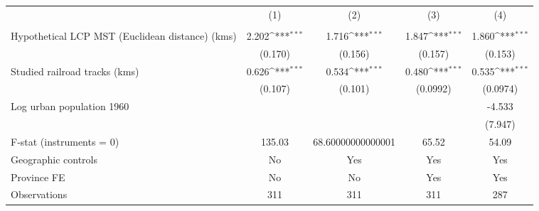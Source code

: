 {
\def\sym#1{\ifmmode^{#1}\else\(^{#1}\)\fi}
\begin{tabular}{l*{4}{c}}
\hline\hline
                &\multicolumn{1}{c}{(1)}&\multicolumn{1}{c}{(2)}&\multicolumn{1}{c}{(3)}&\multicolumn{1}{c}{(4)}\\
                &\multicolumn{1}{c}{}&\multicolumn{1}{c}{}&\multicolumn{1}{c}{}&\multicolumn{1}{c}{}\\
\hline
Hypothetical LCP MST (Euclidean distance) (kms)&    2.202\sym{***}&    1.716\sym{***}&    1.847\sym{***}&    1.860\sym{***}\\
                &  (0.170)         &  (0.156)         &  (0.157)         &  (0.153)         \\
[1em]
Studied railroad tracks (kms)&    0.626\sym{***}&    0.534\sym{***}&    0.480\sym{***}&    0.535\sym{***}\\
                &  (0.107)         &  (0.101)         & (0.0992)         & (0.0974)         \\
[1em]
Log urban population 1960&                  &                  &                  &   -4.533         \\
                &                  &                  &                  &  (7.947)         \\
\hline
F-stat (instruments = 0)&   135.03         &68.60000000000001         &    65.52         &    54.09         \\
Geographic controls&       No         &      Yes         &      Yes         &      Yes         \\
Province FE     &       No         &       No         &      Yes         &      Yes         \\
Observations    &      311         &      311         &      311         &      287         \\
\hline\hline
\end{tabular}
}
